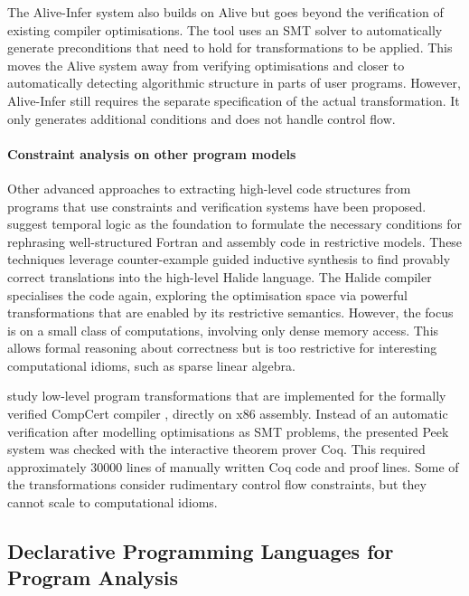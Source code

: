     The Alive-Infer system \citep{Menendez:2017:ADP:3062341.3062372} also builds
    on Alive but goes beyond the verification of existing compiler
    optimisations.
    The tool uses an SMT solver to automatically generate preconditions that
    need to hold for transformations to be applied.
    This moves the Alive system away from verifying optimisations and
    closer to automatically detecting algorithmic structure in parts of user
    programs.
    However, Alive-Infer still requires the separate specification of the actual
    transformation.
    It only generates additional conditions and does not handle control flow.

    \paragraph*{Constraint analysis on other program models}
    Other advanced approaches to extracting high-level code structures
    from programs that use constraints and verification systems have been
    proposed.
    \citet{Mendis2015Helium, Kamil2016Verified} suggest temporal logic as the
    foundation to formulate the necessary conditions for rephrasing
    well-structured Fortran and assembly code in restrictive models.
    These techniques leverage counter-example guided inductive synthesis to find
    provably correct translations into the high-level Halide language.
    The Halide compiler specialises the code again, exploring the
    optimisation space via powerful transformations that are enabled by its
    restrictive semantics.
    However, the focus is on a small class of computations, involving only
    dense memory access.
    This allows formal reasoning about correctness but is too restrictive for
    interesting computational idioms, such as sparse linear algebra.

    \citet{Mullen:2016:VPO:2908080.2908109} study low-level program
    transformations that are implemented for the formally verified CompCert
    compiler \citep{CompCert-ERTS-2018}, directly on x86 assembly.
    Instead of an automatic verification after modelling optimisations
    as SMT problems, the presented Peek system was checked with the interactive
    theorem prover Coq.
    This required approximately 30000 lines of manually written Coq code and
    proof lines.
    Some of the transformations consider rudimentary control flow constraints,
    but they cannot scale to computational idioms.

\subsection{Declarative Programming Languages for Program Analysis}

